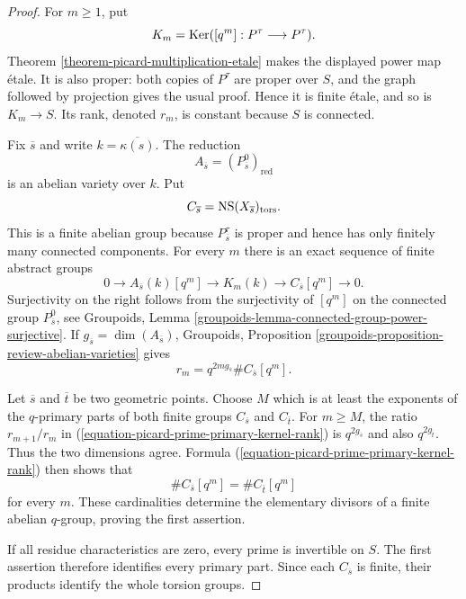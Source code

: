 \begin{proof}
For $m\geq 1$, put
$$
K_m=\mathop{\mathrm{Ker}}([q^m]:P^\tau\longrightarrow P^\tau).
$$
Theorem \ref{theorem-picard-multiplication-etale} makes the displayed power
map \'etale. It is also proper: both copies of $P^\tau$ are proper over $S$,
and the graph followed by projection gives the usual proof. Hence it is
finite \'etale, and so is $K_m\to S$. Its rank, denoted $r_m$, is constant
because $S$ is connected.

Fix $\overline{s}$ and write $k=\overline{\kappa(s)}$. The reduction
$$
A_{\overline{s}}=(P^0_{\overline{s}})_{\mathrm{red}}
$$
is an abelian variety over $k$. Put
$$
C_{\overline{s}}=
\mathop{\rm NS}(X_{\overline{s}})_{\rm tors}.
$$
This is a finite abelian group because $P^\tau_{\overline{s}}$ is proper and
hence has only finitely many connected components. For every $m$ there is an
exact sequence of finite abstract groups
$$
0\longrightarrow A_{\overline{s}}(k)[q^m]
\longrightarrow K_m(k)\longrightarrow C_{\overline{s}}[q^m]
\longrightarrow 0.
$$
Surjectivity on the right follows from the surjectivity of $[q^m]$ on the
connected group $P^0_{\overline{s}}$, see Groupoids, Lemma
\ref{groupoids-lemma-connected-group-power-surjective}. If
$g_{\overline{s}}=\dim(A_{\overline{s}})$, Groupoids, Proposition
\ref{groupoids-proposition-review-abelian-varieties} gives
\begin{equation}
\label{equation-picard-prime-primary-kernel-rank}
r_m=q^{2m g_{\overline{s}}}
\#C_{\overline{s}}[q^m].
\end{equation}

Let $\overline{s}$ and $\overline{t}$ be two geometric points. Choose $M$
which is at least the exponents of the $q$-primary parts of both finite groups
$C_{\overline{s}}$ and $C_{\overline{t}}$. For $m\geq M$, the ratio
$r_{m+1}/r_m$ in
(\ref{equation-picard-prime-primary-kernel-rank}) is
$q^{2g_{\overline{s}}}$ and also
$q^{2g_{\overline{t}}}$. Thus the two dimensions agree. Formula
(\ref{equation-picard-prime-primary-kernel-rank}) then shows that
$$
\#C_{\overline{s}}[q^m]=\#C_{\overline{t}}[q^m]
$$
for every $m$. These cardinalities determine the elementary divisors of a
finite abelian $q$-group, proving the first assertion.

If all residue characteristics are zero, every prime is invertible on $S$.
The first assertion therefore identifies every primary part. Since each
$C_{\overline{s}}$ is finite, their products identify the whole torsion
groups.
\end{proof}

